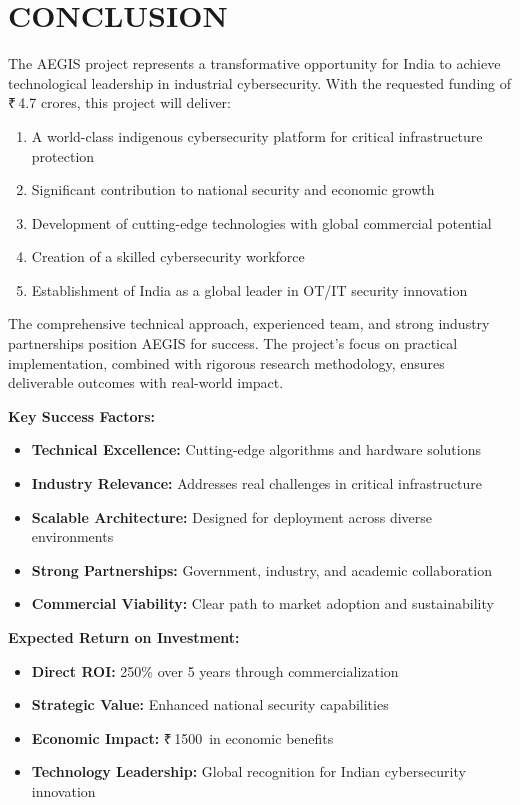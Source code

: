 \documentclass[12pt,a4paper]{article}
\newcommand{\rupees}{₹\,}
\newcommand{\crores}{\text{ Crores}}
\begin{document}
\newpage

\section{CONCLUSION}

The AEGIS project represents a transformative opportunity for India to achieve technological leadership in industrial cybersecurity. With the requested funding of \rupees 4.7 crores, this project will deliver:

\begin{enumerate}
    \item A world-class indigenous cybersecurity platform for critical infrastructure protection
    \item Significant contribution to national security and economic growth
    \item Development of cutting-edge technologies with global commercial potential
    \item Creation of a skilled cybersecurity workforce
    \item Establishment of India as a global leader in OT/IT security innovation
\end{enumerate}

The comprehensive technical approach, experienced team, and strong industry partnerships position AEGIS for success. The project's focus on practical implementation, combined with rigorous research methodology, ensures deliverable outcomes with real-world impact.

\textbf{Key Success Factors:}
\begin{itemize}
    \item \textbf{Technical Excellence:} Cutting-edge algorithms and hardware solutions
    \item \textbf{Industry Relevance:} Addresses real challenges in critical infrastructure
    \item \textbf{Scalable Architecture:} Designed for deployment across diverse environments
    \item \textbf{Strong Partnerships:} Government, industry, and academic collaboration
    \item \textbf{Commercial Viability:} Clear path to market adoption and sustainability
\end{itemize}

\textbf{Expected Return on Investment:}
\begin{itemize}
    \item \textbf{Direct ROI:} 250\% over 5 years through commercialization
    \item \textbf{Strategic Value:} Enhanced national security capabilities
    \item \textbf{Economic Impact:} \rupees 1500\crores\ in economic benefits
    \item \textbf{Technology Leadership:} Global recognition for Indian cybersecurity innovation
\end{itemize}
\end{document}
